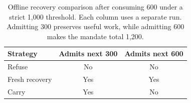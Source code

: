 \begin{table}[htbp]
\centering
\caption{Offline recovery comparison after consuming 600 under a strict
1,000 threshold. Each column uses a separate run. Admitting 300 preserves
useful work, while admitting 600 makes the mandate total 1,200.}
\label{tab:recovery}
\begin{tabular}{@{}lcc@{}}
\toprule
Strategy & Admits next 300 & Admits next 600 \\
\midrule
Refuse & No & No \\
Fresh recovery & Yes & Yes \\
Carry & Yes & No \\
\bottomrule
\end{tabular}
\end{table}
